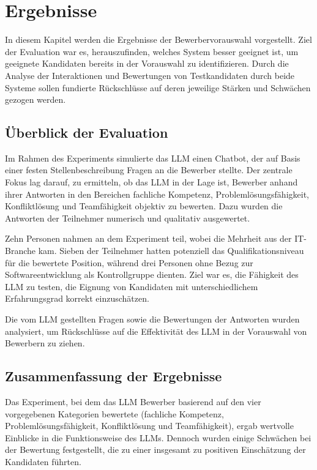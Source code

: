 
\chapter{Ergebnisse}

In diesem Kapitel werden die Ergebnisse der Bewerbervorauswahl vorgestellt. Ziel der Evaluation war es, herauszufinden, welches System besser geeignet ist, um geeignete Kandidaten bereits in der Vorauswahl zu identifizieren. Durch die Analyse der Interaktionen und Bewertungen von Testkandidaten durch beide Systeme sollen fundierte Rückschlüsse auf deren jeweilige Stärken und Schwächen gezogen werden.

\section{Überblick der Evaluation}

Im Rahmen des Experiments simulierte das \acs{LLM} einen Chatbot, der auf Basis einer festen Stellenbeschreibung Fragen an die Bewerber stellte. Der zentrale Fokus lag darauf, zu ermitteln, ob das \acs{LLM} in der Lage ist, Bewerber anhand ihrer Antworten in den Bereichen fachliche Kompetenz, Problemlösungsfähigkeit, Konfliktlösung und Teamfähigkeit objektiv zu bewerten. Dazu wurden die Antworten der Teilnehmer numerisch und qualitativ ausgewertet.

Zehn Personen nahmen an dem Experiment teil, wobei die Mehrheit aus der IT-Branche kam. Sieben der Teilnehmer hatten potenziell das Qualifikationsniveau für die bewertete Position, während drei Personen ohne Bezug zur Softwareentwicklung als Kontrollgruppe dienten. Ziel war es, die Fähigkeit des \acs{LLM} zu testen, die Eignung von Kandidaten mit unterschiedlichem Erfahrungsgrad korrekt einzuschätzen.

Die vom \acs{LLM} gestellten Fragen sowie die Bewertungen der Antworten wurden analysiert, um Rückschlüsse auf die Effektivität des \acs{LLM} in der Vorauswahl von Bewerbern zu ziehen.

\section{Zusammenfassung der Ergebnisse}

Das Experiment, bei dem das \acs{LLM} Bewerber basierend auf den vier vorgegebenen Kategorien bewertete (fachliche Kompetenz, Problemlösungsfähigkeit, Konfliktlösung und Teamfähigkeit), ergab wertvolle Einblicke in die Funktionsweise des \acs{LLM}s. Dennoch wurden einige Schwächen bei der Bewertung festgestellt, die zu einer insgesamt zu positiven Einschätzung der Kandidaten führten.

